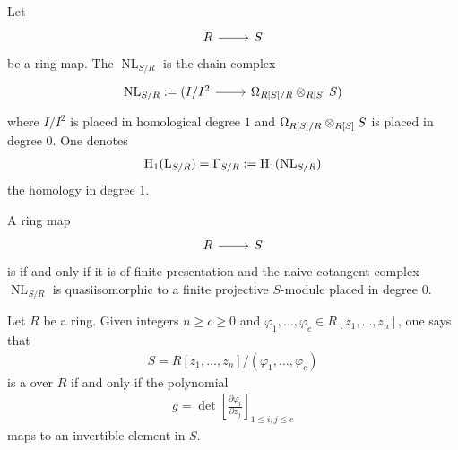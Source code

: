 \documentclass [11 pt, oneside] {article}
\begin{document}
 \begin{definition}\label{}\text{}
Let
\[
\begin{tikzcd}
R\ar[r]&S
\end{tikzcd}
\] 
be a ring map. The  $\operatorname{NL}_{S/R}$ is the chain complex 
\[
\begin{tikzcd}
\operatorname{NL}_{S/R} := (I/I^2 \ar[r]& \Omega_{R[S]/R}\tensor_{R[S]} S)
\end{tikzcd}
\]
where $I/I^2$ is placed in homological degree $1$ and $\Omega_{R[S]/R} \otimes_{R[S]} S$ is placed in degree $0$. One denotes
\begin{align*}
	\operatorname{H}_1(\operatorname{L}_{S/R}) = \Gamma_{S/R} := \operatorname{H}_1 (\operatorname{NL}_{S/R})
\end{align*}
the homology in degree $1$.
\end{definition}



\begin{definition}\label{}\text{}
A ring map
\[
\begin{tikzcd}
R\ar[r]&S
\end{tikzcd}
\] 
 is  if and only if it is of finite presentation and the naive cotangent complex $\operatorname{NL}_{S/R}$ is quasiisomorphic to a finite projective $S$-module placed in degree $0$.
\end{definition}

\begin{definition}\label{}\text{}
Let $R$ be a ring. Given integers $n\ge c\ge 0$ and $\varphi_1,\hdots,\varphi_c\in R[z_1,\hdots, z_n]$, one says that 
\begin{align*}
	S = R[z_1,\hdots, z_n] /(\varphi_1,\hdots, \varphi_c)
\end{align*}
is a  over $R$ if and only if the polynomial
\begin{align*}
	g = \det \left[ \frac{\partial \varphi_i}{\partial z_j} \right]_{1\le i,j\le c} 
\end{align*}
maps to an invertible element in $S$.
\end{definition}
\end{document}
